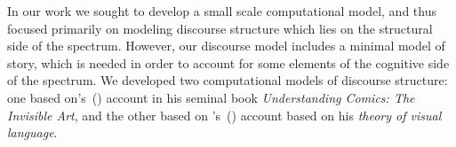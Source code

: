 


In our work we sought to develop a small scale computational model, and thus focused primarily on modeling discourse structure which lies on the structural side of the spectrum. However, our discourse model includes a minimal model of story, which is needed in order to account for some elements of the cognitive side of the spectrum.  We developed two computational models of discourse structure: one based on\citeauthor{mcCloud1993understanding}'s~(\citeyear{mcCloud1993understanding}) account in his seminal book \emph{Understanding Comics: The Invisible Art}, and the other based on \citeauthor{cohn2013visual}'s~(\citeyear{cohn2013visual}) account based on his \emph{theory of visual language}.


